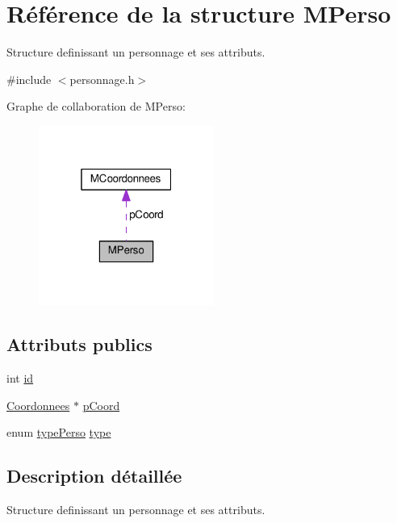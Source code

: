 \hypertarget{structMPerso}{}\section{Référence de la structure M\+Perso}
\label{structMPerso}


Structure definissant un personnage et ses attributs.  




{\ttfamily \#include $<$personnage.\+h$>$}



Graphe de collaboration de M\+Perso\+:
\nopagebreak
\begin{figure}[H]
\begin{center}
\leavevmode
\includegraphics[width=163pt]{structMPerso__coll__graph}
\end{center}
\end{figure}
\subsection*{Attributs publics}
\begin{DoxyCompactItemize}
\item 
int \hyperlink{structMPerso_af6a4c47de69856669b2f1810d4c870e7}{id}
\item 
\hyperlink{coordonnees_8h_a79929cdfee7bd985a5e4e25276bb3ba9}{Coordonnees} $\ast$ \hyperlink{structMPerso_aa1a6adaf74d536a913f11ed632ddb8d1}{p\+Coord}
\item 
enum \hyperlink{personnage_8h_a3f6a2951aa3d5d428dd6d61e74db0d75}{type\+Perso} \hyperlink{structMPerso_a476ff327af93f97f1ae6408e2ebc1986}{type}
\end{DoxyCompactItemize}


\subsection{Description détaillée}
Structure definissant un personnage et ses attributs. 

